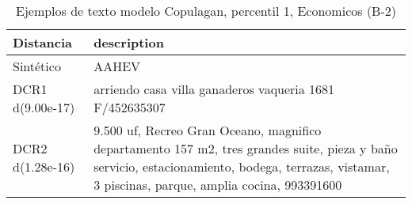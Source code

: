 \begin{table}[H]
\centering
\fontsize{10}{14}\selectfont
\caption{Ejemplos de texto modelo Copulagan, percentil 1, Economicos (B-2)}
\label{table-example-economicos-b-2-copulagan-1p-text}
\begin{tabular}{|l|m{35em}|}
\hline
\rowcolor[gray]{0.8}
Distancia & description \\
\hline Sintético & AAHEV \\
\hline DCR1 d(9.00e-17) & arriendo casa villa ganaderos vaqueria 1681 F/452635307 \\
\hline DCR2 d(1.28e-16) & 9.500 uf, Recreo Gran Oceano, magnifico departamento 157 m2, tres grandes suite, pieza y ba\~no servicio, estacionamiento, bodega, terrazas, vistamar, 3 piscinas, parque, amplia cocina, 993391600 \\
\hline
\end{tabular}
\end{table}
